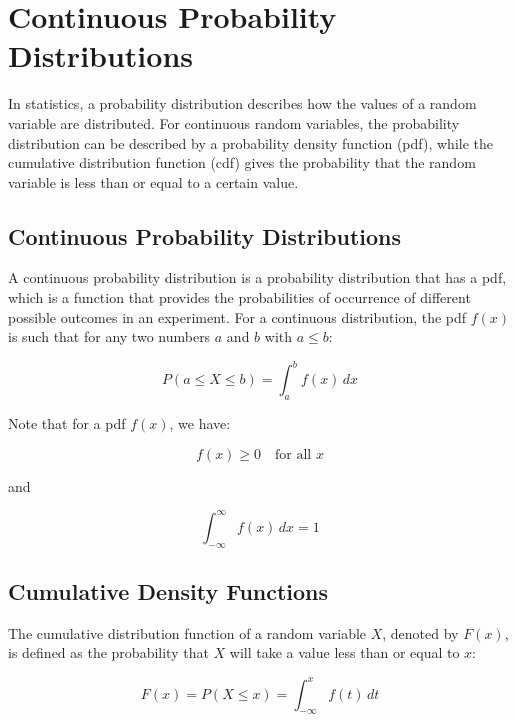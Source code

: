 \chapter{Continuous Probability Distributions}

In statistics, a probability distribution describes how the values of
a random variable are distributed. For continuous random variables,
the probability distribution can be described by a probability density
function (pdf), while the cumulative distribution function (cdf) gives
the probability that the random variable is less than or equal to a
certain value.   

\section{Continuous Probability Distributions}

A continuous probability distribution is a probability distribution
that has a pdf, which is a function that provides the probabilities of
occurrence of different possible outcomes in an experiment. For a
continuous distribution, the pdf $f(x)$ is such that for any two
numbers $a$ and $b$ with $a \leq b$:

\begin{equation}
P(a \leq X \leq b) = \int_{a}^{b} f(x) \, dx
\end{equation}

Note that for a pdf $f(x)$, we have:

\begin{equation}
f(x) \geq 0 \quad \text{for all } x
\end{equation}

and

\begin{equation}
\int_{-\infty}^{\infty} f(x) \, dx = 1
\end{equation}

\section{Cumulative Density Functions}

The cumulative distribution function of a random variable $X$, denoted
by $F(x)$, is defined as the probability that $X$ will take a value
less than or equal to $x$:

\begin{equation}
F(x) = P(X \leq x) = \int_{-\infty}^{x} f(t) \, dt
\end{equation}

